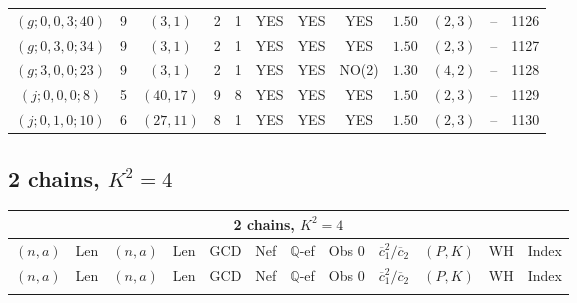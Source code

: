 \begin{longtable}{|c|c|c|c|c|c|c|c|c|c|c|c|}
$(g;0,0,3;40)$ & 9 & $(3,1)$ & 2 & 1 & YES & YES & YES & $1.50$ & $(2,3)$ & -- & 1126\\
$(g;0,3,0;34)$ & 9 & $(3,1)$ & 2 & 1 & YES & YES & YES & $1.50$ & $(2,3)$ & -- & 1127\\
$(g;3,0,0;23)$ & 9 & $(3,1)$ & 2 & 1 & YES & YES & NO(2) & $1.30$ & $(4,2)$ & -- & 1128\\
$(j;0,0,0;8)$ & 5 & $(40,17)$ & 9 & 8 & YES & YES & YES & $1.50$ & $(2,3)$ & -- & 1129\\
$(j;0,1,0;10)$ & 6 & $(27,11)$ & 8 & 1 & YES & YES & YES & $1.50$ & $(2,3)$ & -- & 1130
\end{longtable}
\subsection{2 chains, $K^2 = 4$}
\begin{longtable}{|c|c|c|c|c|c|c|c|c|c|c|c|}
\hline
\multicolumn{12}{|c|}{2 chains, $K^2 = 4$}\\
\hline
$(n,a)$ & Len & $(n,a)$ & Len & GCD & Nef & $\mathbb Q$-ef & Obs 0 & $\overline c_1^2 / \overline c_2$ & $(P,K)$ & WH & Index\\
\hline
\endfirsthead

\hline
$(n,a)$ & Len & $(n,a)$ & Len & GCD & Nef & $\mathbb Q$-ef & Obs 0 & $\overline c_1^2 / \overline c_2$ & $(P,K)$ & WH & Index\\
\hline
\endhead
\hline
\endfoot


\end{longtable}
